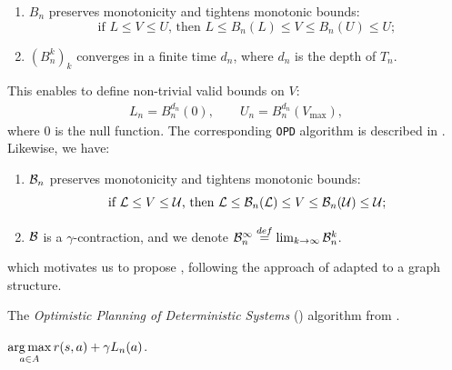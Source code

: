 \documentclass[runningheads]{llncs}
\begin{document}
\begin{lemma}[Properties of $B_n$]
	\label{lem:properties-b-tree}
	\begin{enumerate}[label=(\roman*)]
		\item $B_n$ preserves monotonicity and tightens monotonic bounds: $$
		\text{if } L\leq V\leq U \text{, then } L \leq B_n(L) \leq V \leq B_n(U) \leq U;
		$$
		\item $(B_n^k)_k$ converges in a finite time $d_n$, where $d_n$ is the depth of $T_n$. 
	\end{enumerate}
\end{lemma}
This enables \citet{Hren2008optimistic} to define non-trivial valid bounds on $V$:
\begin{align}
\label{eq:opd-bounds}
L_n = B_n^{d_n}(0), \qquad U_n = B_n^{d_n}(V_{\max}),
\end{align}
where $0$ is the null function.
The corresponding \texttt{OPD} algorithm is described in . Likewise, we have:
\begin{lemma}[Properties of $\cB_n$]
	\label{lem:properties-b-graph}
	\begin{enumerate}[label=(\roman*)]
		\item $\cB_n$ preserves monotonicity and tightens monotonic bounds: $$
		\text{if } \mathcal{L}\leq V\leq \mathcal{U} \text{, then } \mathcal{L} \leq \mathcal{B}_n(\mathcal{L}) \leq V \leq \mathcal{B}_n(\mathcal{U}) \leq \mathcal{U};
		$$
		\item $\mathcal{B}$ is a $\gamma$-contraction, and we denote $\mathcal{B}_n^{\infty} \stackrel{def}{=} \lim_{k\rightarrow \infty} \mathcal{B}_n^k$.
	\end{enumerate}
\end{lemma}
which motivates us to propose , following the approach of  adapted to a graph structure.

\begin{algorithm}[th]
	\caption{The \emph{Optimistic Planning of Deterministic Systems} (\OPD) algorithm from \citep{Hren2008optimistic}.}
	\label{alg:opd}
	\DontPrintSemicolon
	\Return $\displaystyle\operatorname*{arg\,max}_{a\in A} r(s, a) + \gamma L_n(a)$. \;
\end{algorithm}
\end{document}
